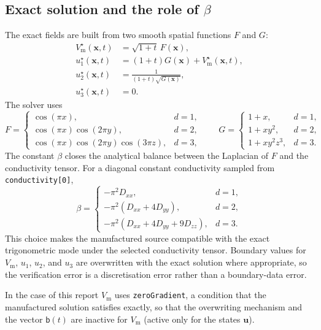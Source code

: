\documentclass[11pt,a4paper]{article}
\newcommand{\code}[1]{\texttt{\small #1}}
\newcommand{\Vm}{V_{\text{m}}}
\begin{document}
\subsection{Exact solution and the role of \texorpdfstring{$\beta$}{beta}}

The exact fields are built from two smooth spatial functions $F$ and $G$:
\begin{align}
  \Vm^\star(\mathbf{x},t) &= \sqrt{1+t}\,F(\mathbf{x}),\\
  u_1^\star(\mathbf{x},t) &= (1+t)G(\mathbf{x})+\Vm^\star(\mathbf{x},t),\\
  u_2^\star(\mathbf{x},t) &= \frac{1}{(1+t)\sqrt{G(\mathbf{x})}},\\
  u_3^\star(\mathbf{x},t) &= 0.
\end{align}
The solver uses
\begin{equation}
F =
\begin{cases}
\cos(\pi x), & d=1,\\
\cos(\pi x)\cos(2\pi y), & d=2,\\
\cos(\pi x)\cos(2\pi y)\cos(3\pi z), & d=3,
\end{cases}
\qquad
G =
\begin{cases}
1+x, & d=1,\\
1+x y^2, & d=2,\\
1+x y^2 z^3, & d=3.
\end{cases}
\end{equation}
The constant $\beta$ closes the analytical balance between the Laplacian of
$F$ and the conductivity tensor. For a diagonal constant conductivity sampled
from \code{conductivity[0]},
\begin{equation}
  \beta =
  \begin{cases}
    -\pi^2 D_{xx}, & d=1,\\
    -\pi^2(D_{xx}+4D_{yy}), & d=2,\\
    -\pi^2(D_{xx}+4D_{yy}+9D_{zz}), & d=3.
  \end{cases}
\end{equation}
This choice makes the manufactured source compatible with the exact
trigonometric mode under the selected conductivity tensor. Boundary values for
$\Vm$, $u_1$, $u_2$, and $u_3$ are overwritten with the exact solution where
appropriate, so the verification error is a discretisation error rather than a
boundary-data error.

In the case of this report $\Vm$ uses \code{zeroGradient}, a condition that the manufactured solution satisfies exactly, so that the overwriting mechanism and the vector $\mathsf{b}(t)$ are inactive for $\Vm$ (active only for the states $\mathbf{u}$).
\end{document}
